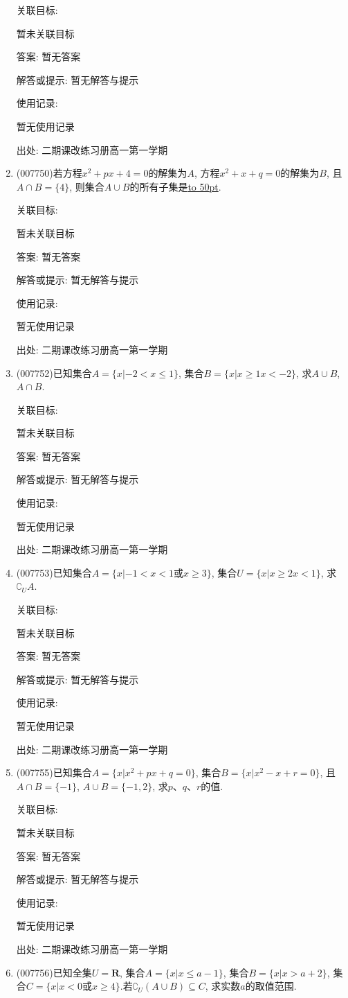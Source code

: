 \documentclass[10pt,a4paper]{article}
\newcommand{\blank}[1]{\underline{\hbox to #1pt{}}}
\begin{document}
\begin{enumerate}[1.]
关联目标:

暂未关联目标

答案: 暂无答案

解答或提示: 暂无解答与提示

使用记录:

暂无使用记录


出处: 二期课改练习册高一第一学期
\item { (007750)}若方程$x^2+px+4=0$的解集为$A$, 方程$x^2+x+q=0$的解集为$B$, 且$A\cap B=\{4\}$, 则集合$A\cup B$的所有子集是\blank{50}.


关联目标:

暂未关联目标

答案: 暂无答案

解答或提示: 暂无解答与提示

使用记录:

暂无使用记录


出处: 二期课改练习册高一第一学期
\item { (007752)}已知集合$A=\{x|-2<x\le 1\}$, 集合$B=\{x|x\ge 1x<-2\}$, 求$A\cup B$, $A\cap B$.


关联目标:

暂未关联目标

答案: 暂无答案

解答或提示: 暂无解答与提示

使用记录:

暂无使用记录


出处: 二期课改练习册高一第一学期
\item { (007753)}已知集合$A=\{x|-1<x<1$或$x\ge 3\}$, 集合$U=\{x|x\ge 2x<1\}$, 求$\complement _UA$.


关联目标:

暂未关联目标

答案: 暂无答案

解答或提示: 暂无解答与提示

使用记录:

暂无使用记录


出处: 二期课改练习册高一第一学期
\item { (007755)}已知集合$A=\{x|x^2+px+q=0\}$, 集合$B=\{x|x^2-x+r=0\}$, 且$A\cap B=\{-1\}$, $A\cup B=\{-1,2\}$, 求$p$、$q$、$r$的值.


关联目标:

暂未关联目标

答案: 暂无答案

解答或提示: 暂无解答与提示

使用记录:

暂无使用记录


出处: 二期课改练习册高一第一学期
\item { (007756)}已知全集$U=\mathbf{R}$, 集合$A=\{x|x\le a-1\}$, 集合$B=\{x|x>a+2\}$, 集合$C=\{x|x<0$或$x\ge 4\}$.若$\complement _U(A\cup B)\subseteq C$, 求实数$a$的取值范围.



\end{enumerate}
\end{document}

